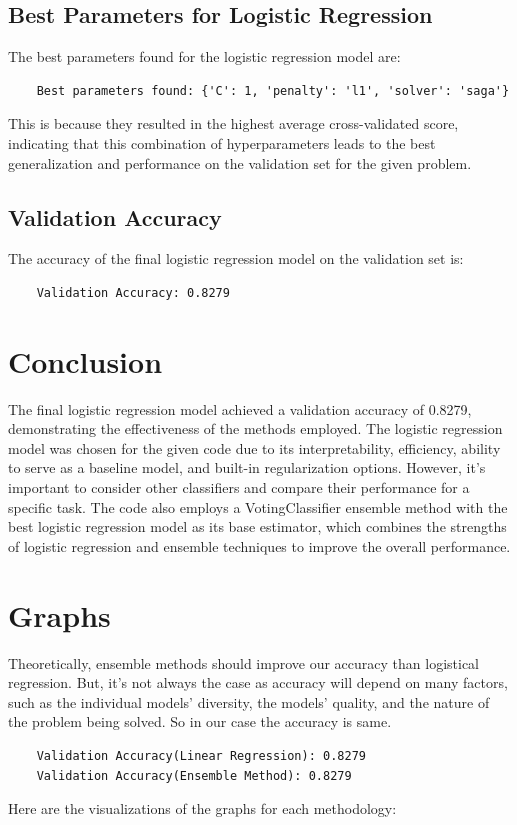 \documentclass{article}
\begin{document}
\subsection{Best Parameters for Logistic Regression}
The best parameters found for the logistic regression model are:

\begin{verbatim}
    Best parameters found: {'C': 1, 'penalty': 'l1', 'solver': 'saga'}
\end{verbatim}

This is because they resulted in the highest average cross-validated score, indicating that this combination of hyperparameters leads to the best generalization and performance on the validation set for the given problem.

\subsection{Validation Accuracy}
The accuracy of the final logistic regression model on the validation set is:

\begin{verbatim}
    Validation Accuracy: 0.8279
\end{verbatim}

\section{Conclusion}
The final logistic regression model achieved a validation accuracy of 0.8279, demonstrating the effectiveness of the methods employed. The logistic regression model was chosen for the given code due to its interpretability, efficiency, ability to serve as a baseline model, and built-in regularization options. However, it's important to consider other classifiers and compare their performance for a specific task. The code also employs a VotingClassifier ensemble method with the best logistic regression model as its base estimator, which combines the strengths of logistic regression and ensemble techniques to improve the overall performance.

\section{Graphs}
Theoretically, ensemble methods should improve our accuracy than logistical regression. But, it's not always the case as accuracy will depend on many factors, such as the individual models' diversity, the models' quality, and the nature of the problem being solved.
So in our case the accuracy is same.
\begin{verbatim}
    Validation Accuracy(Linear Regression): 0.8279
    Validation Accuracy(Ensemble Method): 0.8279
\end{verbatim}
Here are the visualizations of the graphs for each methodology:
\end{document}
